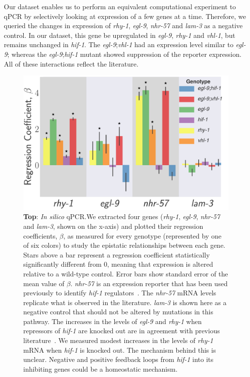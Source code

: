 \documentclass[9pt,twocolumn,twoside]{pnas-new}
\newcommand{\egl}{\emph{egl-9}}
\newcommand{\rhy}{\emph{rhy-1}}
\newcommand{\vhl}{\emph{vhl-1}}
\newcommand{\hif}{\emph{hif-1}}
\newcommand{\nhr}{\emph{nhr-57}}
\newcommand{\lam}{\emph{lam-3}}
\begin{document}
Our dataset enables us to perform an equivalent computational experiment to qPCR
by selectively looking at expression of a few genes at a time. Therefore, we
queried the changes in expression of \rhy{}, \egl{}, \nhr{} and \lam{} as a negative
control. In our dataset, this gene be upregulated in \egl{}, \rhy{} and
\vhl{}, but remains unchanged in \hif{}.
The \egl{};\vhl{} had an expression level similar to \egl{}; whereas the
\egl{};\hif{} mutant showed suppression of the reporter expression. All of these
interactions reflect the literature.

\begin{figure}[tbhp]
\centering
\includegraphics[width=\linewidth]{figs/qpcr.pdf}
\caption{
\textbf{Top}: \emph{In silico} qPCR.\@ We extracted
four genes (\rhy{}, \egl{}, \nhr{} and \lam{}, shown on the x-axis) and plotted
their regression coefficients, $\beta$, as measured for every genotype (represented by
one of six colors) to study the epistatic relationships between each gene.
Stars above a bar represent a regression coefficient statistically significantly
different from 0, meaning that expression is altered relative to a
wild-type control. Error bars show standard error of the mean value of $\beta$.
\nhr{} is an expression
reporter that has been used previously to identify \hif{}
regulators~\cite{Shen2006,Shao2009}. The \nhr{} mRNA levels replicate what is
observed in the literature. \lam{} is shown here as a negative control that
should not be altered by mutations in this pathway. The increases in the levels
of \egl{} and \rhy{} when repressors of \hif{} are knocked out are in agreement
with previous literature~\cite{Powell-Coffman2010}. We measured modest increases
in the levels of \rhy{} mRNA when \hif{} is knocked out. The mechanism behind
this is unclear. Negative and positive feedback loops from \hif{} into its
inhibiting genes could be a homeostatic mechanism.
}
\label{fig:qpcr}
\end{figure}
\end{document}

